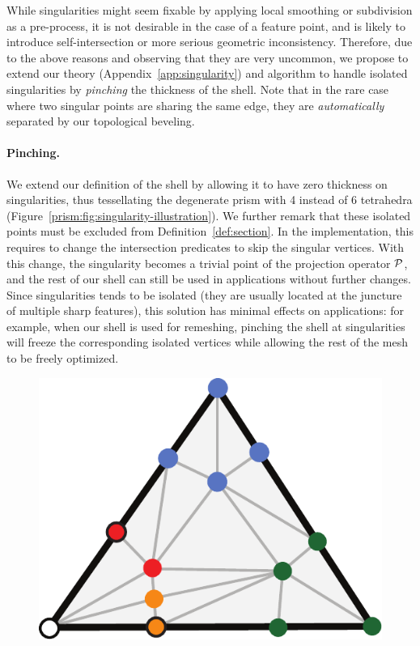 While singularities might seem fixable by applying local smoothing or subdivision as a pre-process, it is not desirable in the case of a feature point, and is likely to introduce self-intersection or more serious geometric inconsistency.
Therefore, due to the above reasons and observing that they are very uncommon, we propose to extend our theory (Appendix~\ref{app:singularity}) and algorithm to handle isolated singularities  by \emph{pinching} the thickness of the shell. Note that in the rare case where two singular points are sharing the same edge, they are \emph{automatically} separated by our topological beveling.

\paragraph{Pinching.} 
We extend our definition of the shell by allowing it to have zero thickness on singularities, thus tessellating the degenerate prism with 4 instead of 6 tetrahedra (Figure~\ref{prism:fig:singularity-illustration}). We further remark that these isolated points must be excluded from Definition~\ref{def:section}. In the implementation, this requires to change the intersection predicates to skip the singular vertices.
With this change, the singularity becomes a trivial point of the projection operator $\P$,
and the rest of our shell can still be used in applications without further changes. Since singularities tends to be isolated (they are usually located at the juncture of multiple sharp features), this solution has minimal effects on applications: for example, when our shell is used for remeshing, pinching the shell at singularities will freeze the corresponding isolated vertices while allowing the rest of the mesh to be freely optimized.

\begin{figure}
    \includegraphics[width=1\linewidth]{prism-tex/figs/singular_bevel}
\end{figure}

